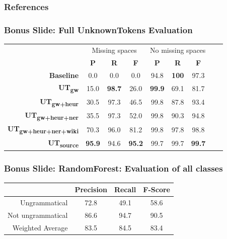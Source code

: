 \documentclass[table]{beamer}
\begin{document}
\begin{frame}
  \frametitle{References}
  
  \footnotesize
\end{frame}

\begin{frame}
  \frametitle{Bonus Slide: Full \textbf{UnknownTokens} Evaluation}
  \begin{tabular}{r|c|c|c|c|c|c|c|c|}
  & \multicolumn{3}{c|}{Missing spaces} & \multicolumn{3}{c|}{No missing spaces}\\
  & \textbf{P} & \textbf{R} & \textbf{F} & \textbf{P} & \textbf{R} & \textbf{F}\\
  \hline
  \textbf{Baseline} & 0.0 & 0.0 & 0.0 & 94.8 & \textbf{100} & 97.3\\
  \hline\hline
  \textbf{UT\textsubscript{gw}} & 15.0 & \textbf{98.7} & 26.0 & \textbf{99.9} & 69.1 & 81.7\\
  \hline
  \textbf{UT\textsubscript{gw+heur}} & 30.5 & 97.3 & 46.5 & 99.8 & 87.8 & 93.4\\
  \hline
  \textbf{UT\textsubscript{gw+heur+ner}} & 35.5 & 97.3 & 52.0 & 99.8 & 90.3 & 94.8\\
  \hline
  \textbf{UT\textsubscript{gw+heur+ner+wiki}} & 70.3 & 96.0 & 81.2 & 99.8 & 97.8 & 98.8\\
  \hline\hline
  \textbf{UT\textsubscript{source}} & \textbf{95.9} & 94.6 & \textbf{95.2} & 99.7 & 99.7 & \textbf{99.7}\\
  \hline
  \end{tabular}
\end{frame}

\begin{frame}
  \frametitle{Bonus Slide: \textbf{RandomForest}: Evaluation of all classes}
  \quad\quad\begin{tabular}{r|c|c|c|}
  & \textbf{Precision} & \textbf{Recall} & \textbf{F-Score}\\
  \hline
  Ungrammatical & 72.8 & 49.1 & 58.6\\
  \hline\pause
  Not ungrammatical & 86.6 & 94.7 & 90.5\\
  \hline
  Weighted Average & 83.5 & 84.5 & 83.4\\
  \hline
  \end{tabular}
\end{frame}
\end{document}

